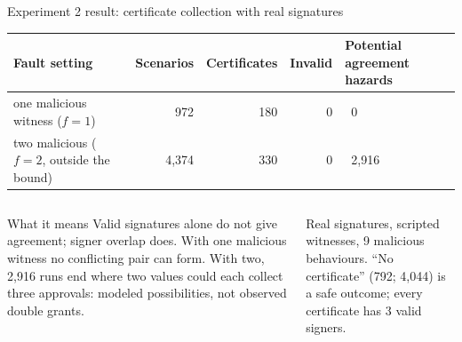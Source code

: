 \documentclass[aspectratio=169,10pt]{beamer}
\newcommand{\cmark}{\textcolor{okgreen}{\ding{51}}}
\newcommand{\xmark}{\textcolor{badred!80}{\ding{55}}}
\begin{document}
\begin{frame}{Experiment 2 result: certificate collection with real signatures}
\vspace{0.3em}
\footnotesize
\renewcommand{\arraystretch}{1.3}
\begin{tabular}{@{}L{0.33\textwidth} r r r L{0.23\textwidth}@{}}
\toprule
\textbf{Fault setting} & \textbf{Scenarios} & \textbf{Certificates} & \textbf{Invalid} & \textbf{Potential agreement hazards} \\
\midrule
one malicious witness ($f = 1$) & 972 & 180 & \cmark\ 0 & \cmark\ 0 \\
two malicious ($f = 2$, outside the bound) & 4,374 & 330 & \cmark\ 0 & \xmark\ 2,916 \\
\bottomrule
\end{tabular}

\vspace{0.6em}
\begin{columns}[T,onlytextwidth]
\begin{alertblock}{What it means}
\scriptsize Valid signatures alone do not give agreement; signer overlap does. With one malicious witness no conflicting pair can form. With two, 2,916 runs end where two values could each collect three approvals: modeled possibilities, not observed double grants.
\end{alertblock}
\scriptsize\color{datagray}
Real signatures, scripted witnesses, 9 malicious behaviours. ``No certificate'' (792; 4,044) is a safe outcome; every certificate has 3 valid signers.\\[3pt]
\end{columns}
\end{frame}
\end{document}
